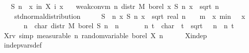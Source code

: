 {\ \ \ {\isachardoublequoteopen}S\ n\ {\isasymequiv}\ {\isasymlambda}x{\isachardot}\ {\isasymSum}i{\isacharless}n{\isachardot}\ X\ i\ x{\isachardoublequoteclose}\isanewline
\ \ \ {\isachardoublequoteopen}weak{\isacharunderscore}conv{\isacharunderscore}m\ {\isacharparenleft}{\isasymlambda}n{\isachardot}\ distr\ M\ borel\ {\isacharparenleft}{\isasymlambda}x{\isachardot}\ S\ n\ x\ {\isacharslash}\ sqrt\ {\isacharparenleft}n\ {\isacharasterisk}\ {\isasymsigma}\isanewline
\ \ \ \ std{\isacharunderscore}normal{\isacharunderscore}distribution{\isachardoublequoteclose}\isanewline
%
\isadelimproof
%
\endisadelimproof
%
\isatagproof
{}\isamarkupfalse%
\ {\isacharminus}\isanewline
\ \ \isamarkupfalse%
\ {\isacharquery}S{\isacharprime}\ {\isacharequal}\ {\isachardoublequoteopen}{\isasymlambda}n\ x{\isachardot}\ S\ n\ x\ {\isacharslash}\ sqrt\ {\isacharparenleft}real\ n\ {\isacharasterisk}\ {\isasymsigma}\ \ {\isacharquery}m\ {\isacharequal}\ {\isachardoublequoteopen}{\isasymlambda}x{\isachardot}\ min\ {\isacharparenleft}{}\ {\isacharasterisk}\ x\isanewline
\ \ \isamarkupfalse%
\ {\isasymphi}\ \ {\isachardoublequoteopen}{\isasymphi}\ n\ {\isacharequal}\ char\ {\isacharparenleft}distr\ M\ borel\ {\isacharparenleft}{\isacharquery}S{\isacharprime}\ n{\isacharparenright}{\isacharparenright}{\isachardoublequoteclose}\ \ n\isanewline
\ \ \isamarkupfalse%
\ {\isasympsi}\ \ {\isachardoublequoteopen}{\isasympsi}\ n\ t\ {\isacharequal}\ char\ {\isasymmu}\ {\isacharparenleft}t\ {\isacharslash}\ sqrt\ {\isacharparenleft}{\isasymsigma}\ {\isacharasterisk}\ n{\isacharparenright}{\isacharparenright}{\isachardoublequoteclose}\ \ n\ t\isanewline
\isanewline
\ \ \isamarkupfalse%
\ X{\isacharunderscore}rv\ {\isacharbrackleft}simp{\isacharcomma}\ measurable{\isacharbrackright}{\isacharcolon}\ {\isachardoublequoteopen}{\isasymAnd}n{\isachardot}\ random{\isacharunderscore}variable\ borel\ {\isacharparenleft}X\ n{\isacharparenright}{\isachardoublequoteclose}\isanewline
\ \ \ \ \isamarkupfalse%
\ X{\isacharunderscore}indep\ \isamarkupfalse%
\ indep{\isacharunderscore}vars{\isacharunderscore}def{}\ \isamarkupfalse%
}
